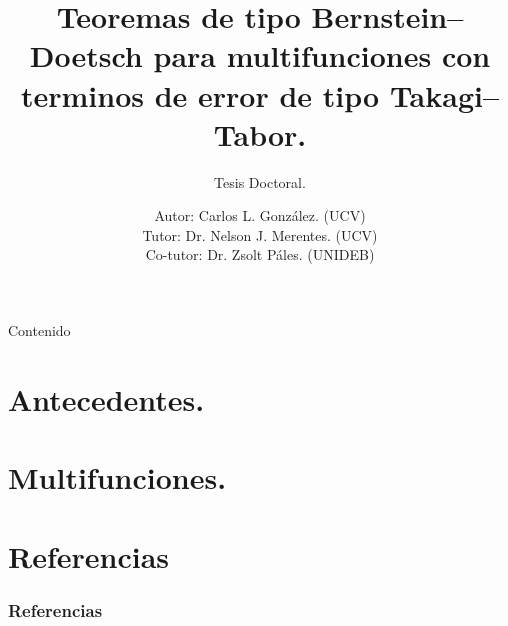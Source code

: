 \documentclass{bredelebeamer}
\title[Teoremas de tipo Bernstein--Doetsch]{
  Teoremas de tipo Bernstein--Doetsch para multifunciones 
  con terminos de error de tipo Takagi--Tabor.
}
\subtitle{Tesis Doctoral.}
\author [Carlos L. González.]{ 
  Autor: Carlos L. González. (UCV)\\
  Tutor: Dr. Nelson J. Merentes. (UCV) \\
  Co-tutor: Dr. Zsolt Páles. (UNIDEB)
}
\begin{document}
\begin{frame}
  \titlepage
\end{frame}

\begin{frame}{Contenido}
  \tableofcontents
\end{frame}

\section{Antecedentes.}


\section{Multifunciones.}


\section{Referencias}
\begin{frame}[allowframebreaks]
  \frametitle{Referencias}
  \scriptsize{}%
  
  \beamertemplatearticlebibitems
\end{frame}
\end{document}
